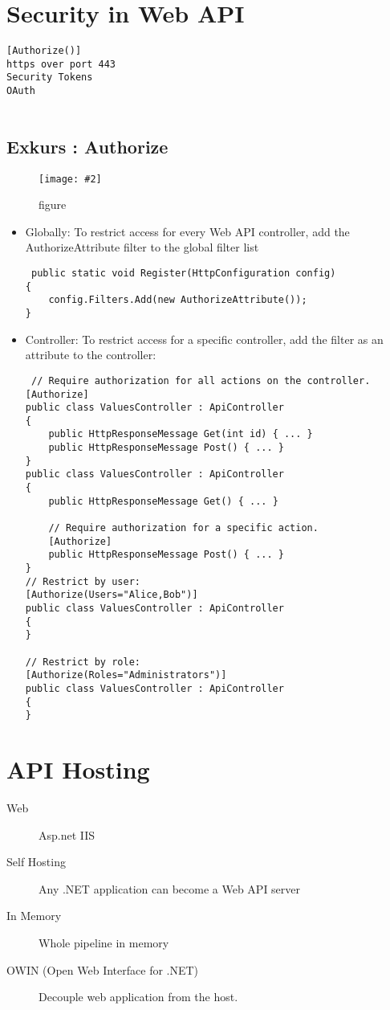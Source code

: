 \documentclass[a4paper,10pt]{scrreprt}
\newcommand{\pic}[2][figure]{\begin{figure}[h]
 \centering
 \texttt{[image: \#2]}
 \caption{#1}
\end{figure}
}
\begin{document}
\section{Security in Web API}
\begin{verbatim}
[Authorize()]
https over port 443
Security Tokens
OAuth
 
\end{verbatim}

\subsection{Exkurs : Authorize}
\pic{webapi_auth01.png}
\begin{itemize}
 \item Globally: To restrict access for every Web API controller, add the AuthorizeAttribute filter to the global filter 
list
\begin{lstlisting}
 public static void Register(HttpConfiguration config)
{
    config.Filters.Add(new AuthorizeAttribute());
}

\end{lstlisting}
\item Controller: To restrict access for a specific controller, add the filter as an attribute to the controller:
\begin{lstlisting}
 // Require authorization for all actions on the controller.
[Authorize]
public class ValuesController : ApiController
{
    public HttpResponseMessage Get(int id) { ... }
    public HttpResponseMessage Post() { ... }
}
public class ValuesController : ApiController
{
    public HttpResponseMessage Get() { ... }

    // Require authorization for a specific action.
    [Authorize]
    public HttpResponseMessage Post() { ... }
}
// Restrict by user:
[Authorize(Users="Alice,Bob")]
public class ValuesController : ApiController
{
}
   
// Restrict by role:
[Authorize(Roles="Administrators")]
public class ValuesController : ApiController
{
}
\end{lstlisting}

\end{itemize}

\section{API Hosting}
\begin{description}
 \item [Web] Asp.net IIS
 \item [Self Hosting] Any .NET application can become a Web API server
 \item [In Memory] Whole pipeline in memory
 \item [OWIN (Open Web Interface for .NET)] Decouple web application from the host. 
\end{description}
\end{document}
